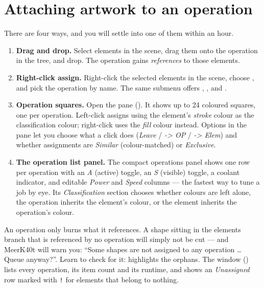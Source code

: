 \section{Attaching artwork to an operation}

There are four ways, and you will settle into one of them within an hour.

\begin{enumerate}[leftmargin=1.6em]
  \item \textbf{Drag and drop.} Select elements in the scene, drag them onto the
        operation in the tree, and drop. The operation gains \emph{references} to
        those elements.
  \item \textbf{Right-click assign.} Right-click the selected elements in the
        scene, choose , and pick the operation by name. The
        same submenu offers ,
        ,  and
        .
  \item \textbf{Operation squares.} Open the  pane
        (). It shows up to 24 coloured squares, one
        per operation. Left-click assigns using the element's \emph{stroke}
        colour as the classification colour; right-click uses the \emph{fill}
        colour instead. Options in the pane let you choose what a click does
        (\emph{Leave} / \emph{-> OP} / \emph{-> Elem}) and whether assignments are
        \emph{Similar} (colour-matched) or \emph{Exclusive}.
  \item \textbf{The operation list panel.} The compact operations panel shows one
        row per operation with an \emph{A} (active) toggle, an \emph{S} (visible)
        toggle, a coolant indicator, and editable \emph{Power} and \emph{Speed}
        columns --- the fastest way to tune a job by eye. Its
        \emph{Classification} section chooses whether colours are left alone, the
        operation inherits the element's colour, or the element inherits the
        operation's colour.
\end{enumerate}

\begin{warnbox}
An operation only burns what it references. A shape sitting in the elements
branch that is referenced by no operation will simply not be cut --- and
MeerK40t will warn you: ``Some shapes are not assigned to any operation \dots{}
Queue anyway?''. Learn to check for it: 
highlights the orphans. The  window
() lists every operation, its item count and its
runtime, and shows an \emph{Unassigned} row marked with \texttt{!} for elements
that belong to nothing.
\end{warnbox}

